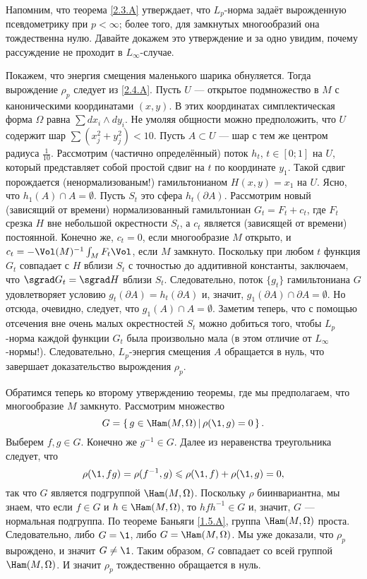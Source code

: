 Напомним, что теорема \ref{2.3.A} утверждает, что $L_p$-норма задаёт вырожденную псевдометрику при $p <\infty$;
более того, для замкнутых многообразий она тождественна нулю.
Давайте докажем это утверждение и за одно увидим, почему рассуждение не проходит в $L_\infty$-случае.

Покажем, что энергия смещения маленького шарика обнуляется.
Тогда вырождение $\rho_p$ следует из \ref{2.4.A}.
Пусть $U$ — открытое подмножество в $M$ с каноническими координатами $(x, y)$.
В этих координатах симплектическая форма $\Omega$ равна $\sum dx_i\wedge dy_i$.
Не умоляя общности можно предположить, что $U$ содержит шар $\sum(x^2_j + y_j^2) <10$.
Пусть $A \subset U$ — шар с тем же центром радиуса $\tfrac1{10}$.
Рассмотрим (частично определённый) поток $h_t$, $t \in [0; 1]$ на $U$, который представляет собой простой сдвиг на $t$ по координате $y_1$.
Такой сдвиг порождается (ненормализованым!) гамильтонианом $H (x, y) = x_1$ на $U$.
Ясно, что $h_1 (A) \cap A = \emptyset$.
Пусть $S_t$ это сфера $h_t (\partial A)$.
Рассмотрим новый (зависящий от времени) нормализованный гамильтониан
$G_t = F_t + c_t$, где $F_t$ срезка $H$ вне небольшой окрестности $S_t$, а $c_t$ является (зависящей от времени) постоянной.
Конечно же, $c_t = 0$, если многообразие $M$ открыто, и $c_t = -\Vol(M)^{-1}\int_M F_t \Vol$, если $M$ замкнуто.
Поскольку при любом $t$ функция $G_t$ совпадает с $H$ вблизи $S_t$ с точностью до аддитивной константы, заключаем, что $\sgrad G_t = \sgrad H$ вблизи $S_t$.
Следовательно, поток $\{g_t\}$ гамильтониана $G$ удовлетворяет условию $g_t (\partial A) = h_t (\partial A)$ и, значит, $g_1 (\partial A) \cap \partial A = \emptyset$.
Но отсюда, очевидно, следует, что $g_1 (A) \cap A = \emptyset$.
Заметим теперь, что с помощью отсечения вне очень малых окрестностей $S_t$ можно добиться того, чтобы $L_p$-норма каждой функции $G_t$ была произвольно мала (в этом отличие от $L_\infty$-нормы!).
Следовательно, $L_p$-энергия смещения $A$ обращается в нуль, что завершает доказательство вырождения $\rho_p$.

Обратимся теперь ко второму утверждению теоремы, где мы предполагаем, что многообразие $M$ замкнуто.
Рассмотрим множество
\[G = \set{g \in \Ham (M, \Omega)}{\rho (\1, g) = 0}.\]
Выберем $f, g \in G$.
Конечно же $g^{-1} \in G$.
Далее из неравенства треугольника следует, что 
\[\rho (\1, f g) = \rho (f^{-1}, g) \le \rho (\1, f) + \rho (\1, g) = 0,\]
так что $G$ является подгруппой $\Ham (M, \Omega)$.
Поскольку $\rho$ биинвариантна, мы знаем, что если $f \in G$ и $h \in \Ham (M, \Omega)$, то $hf h^{-1} \in G$ и, значит, $G$ — нормальная подгруппа.
По теореме Баньяги \ref{1.5.A}, группа $\Ham (M, \Omega)$ проста.
Следовательно, либо $G = {\1}$, либо $G = \Ham (M, \Omega)$.
Мы уже доказали, что $\rho_p$ вырождено, и значит $G \ne {\1}$.
Таким образом, $G$ совпадает со всей группой $\Ham (M, \Omega)$.
И значит $\rho_p$ тождественно обращается в нуль.
\qeds

